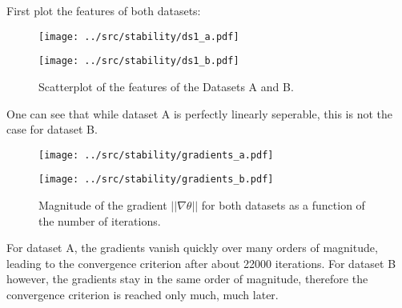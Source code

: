 \begin{answer}
First plot the features of both datasets:
\begin{figure}[h]
    \begin{minipage}[t]{.49\linewidth}
        \centering
        \texttt{[image: ../src/stability/ds1\_a.pdf]}    
    \end{minipage}
    \hfill
    \begin{minipage}[t]{.49\linewidth}
        \centering
        \texttt{[image: ../src/stability/ds1\_b.pdf]}    
    \end{minipage}
    \caption{Scatterplot of the features of the Datasets A and B.}
\end{figure}
One can see that while dataset A is perfectly linearly seperable, this is not the case for dataset B.

\begin{figure}[h]
    \begin{minipage}[t]{.49\linewidth}
        \centering
        \texttt{[image: ../src/stability/gradients\_a.pdf]}    
    \end{minipage}
    \hfill        
    \begin{minipage}[t]{.49\linewidth}
        \centering
        \texttt{[image: ../src/stability/gradients\_b.pdf]}    
    \end{minipage}
    \caption{Magnitude of the gradient $||\nabla\theta||$ for both datasets as a function of the number of iterations.}
\end{figure}
For dataset A, the gradients vanish quickly over many orders of magnitude, leading to the convergence criterion after about 22000 iterations.
For dataset B however, the gradients stay in the same order of magnitude, therefore the convergence criterion is reached only much, much later.

\end{answer}
